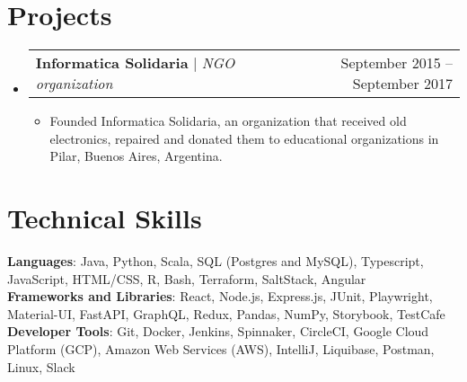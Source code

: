 \documentclass[letterpaper,11pt]{article}
\makeatletter
\newcommand{\resumeItem}[1]{
  \item\small{
    {#1 \vspace{-2pt}}
  }
}
\newcommand{\resumeProjectHeading}[2]{
    \item
    \begin{tabular*}{0.97\textwidth}{l@{\extracolsep{\fill}}r}
      \small#1 & #2 \\
    \end{tabular*}\vspace{-7pt}
}
\newcommand{\resumeSubHeadingListStart}{\begin{itemize}[leftmargin=0.15in, label={}]}
\newcommand{\resumeSubHeadingListEnd}{\end{itemize}}
\newcommand{\resumeItemListStart}{\begin{itemize}}
\newcommand{\resumeItemListEnd}{\end{itemize}\vspace{-5pt}}
\makeatother
\begin{document}
\section{Projects}
    \resumeSubHeadingListStart
      \resumeProjectHeading
          {\textbf{Informatica Solidaria} $|$ \emph{NGO organization}}{September 2015 -- September 2017}
          \resumeItemListStart
            \resumeItem{Founded Informatica Solidaria, an organization that received old electronics, repaired and donated them to educational organizations in Pilar, Buenos Aires, Argentina.}
          \resumeItemListEnd
    \resumeSubHeadingListEnd



%
\section{Technical Skills}
 \begin{itemize}[leftmargin=0.15in, label={}]
    \small{\item{
     \textbf{Languages}{: Java, Python, Scala, SQL (Postgres and MySQL), Typescript, JavaScript, HTML/CSS, R, Bash, Terraform, SaltStack, Angular} \\
     \textbf{Frameworks and Libraries}{: React, Node.js, Express.js, JUnit, Playwright, Material-UI, FastAPI, GraphQL, Redux, Pandas, NumPy, Storybook, TestCafe} \\
     \textbf{Developer Tools}{: Git, Docker, Jenkins, Spinnaker, CircleCI, Google Cloud Platform (GCP), Amazon Web Services (AWS), IntelliJ, Liquibase, Postman, Linux, Slack} \\
    }}
 \end{itemize}


\end{document}
